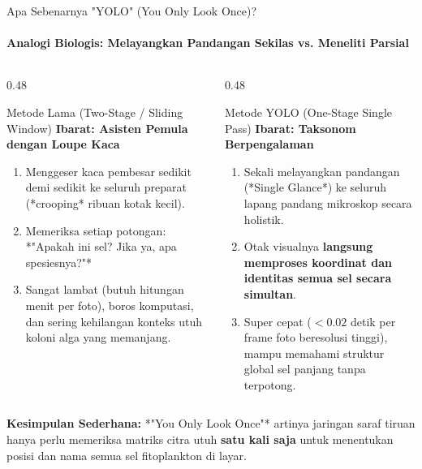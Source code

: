 \documentclass[aspectratio=169, 10pt]{beamer}
\begin{document}
\begin{frame}{Apa Sebenarnya "YOLO" (You Only Look Once)?}
    \framesubtitle{Analogi Biologis: Melayangkan Pandangan Sekilas vs. Meneliti Parsial}
    
    \begin{columns}[T]
        \begin{column}{0.48\textwidth}
            \begin{conceptcard}{Metode Lama (Two-Stage / Sliding Window)}
                \scriptsize
                \textbf{Ibarat: Asisten Pemula dengan Loupe Kaca}
                \begin{enumerate}\setlength\itemsep{3pt}
                    \item Menggeser kaca pembesar sedikit demi sedikit ke seluruh preparat (*crooping* ribuan kotak kecil).
                    \item Memeriksa setiap potongan: *"Apakah ini sel? Jika ya, apa spesiesnya?"*
                    \item Sangat lambat (butuh hitungan menit per foto), boros komputasi, dan sering kehilangan konteks utuh koloni alga yang memanjang.
                \end{enumerate}
            \end{conceptcard}
        \end{column}
        
        \begin{column}{0.48\textwidth}
            \begin{biocard}{Metode YOLO (One-Stage Single Pass)}
                \scriptsize
                \textbf{Ibarat: Taksonom Berpengalaman}
                \begin{enumerate}\setlength\itemsep{3pt}
                    \item Sekali melayangkan pandangan (*Single Glance*) ke seluruh lapang pandang mikroskop secara holistik.
                    \item Otak visualnya \textbf{langsung memproses koordinat dan identitas semua sel secara simultan}.
                    \item Super cepat ($<0.02$ detik per frame foto beresolusi tinggi), mampu memahami struktur global sel panjang tanpa terpotong.
                \end{enumerate}
            \end{biocard}
        \end{column}
    \end{columns}
    
    \vspace{4pt}
    \begin{tcolorbox}[colback=CardBg, colframe=OceanTeal, arc=3pt, boxrule=0.5pt, left=6pt, right=6pt, top=3pt, bottom=3pt]
        \scriptsize\textbf{\color{OceanDeep}Kesimpulan Sederhana:} *"You Only Look Once"* artinya jaringan saraf tiruan hanya perlu memeriksa matriks citra utuh \textbf{satu kali saja} untuk menentukan posisi dan nama semua sel fitoplankton di layar.
    \end{tcolorbox}
\end{frame}
\end{document}
